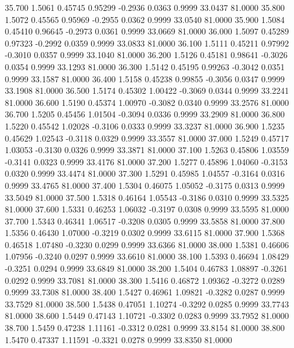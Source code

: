   35.700   1.5061   0.45745   0.95299  -0.2936   0.0363   0.9999  33.0437  81.0000
  35.800   1.5072   0.45565   0.95969  -0.2955   0.0362   0.9999  33.0540  81.0000
  35.900   1.5084   0.45410   0.96645  -0.2973   0.0361   0.9999  33.0669  81.0000
  36.000   1.5097   0.45289   0.97323  -0.2992   0.0359   0.9999  33.0833  81.0000
  36.100   1.5111   0.45211   0.97992  -0.3010   0.0357   0.9999  33.1040  81.0000
  36.200   1.5126   0.45181   0.98641  -0.3026   0.0354   0.9999  33.1293  81.0000
  36.300   1.5142   0.45195   0.99263  -0.3042   0.0351   0.9999  33.1587  81.0000
  36.400   1.5158   0.45238   0.99855  -0.3056   0.0347   0.9999  33.1908  81.0000
  36.500   1.5174   0.45302   1.00422  -0.3069   0.0344   0.9999  33.2241  81.0000
  36.600   1.5190   0.45374   1.00970  -0.3082   0.0340   0.9999  33.2576  81.0000
  36.700   1.5205   0.45456   1.01504  -0.3094   0.0336   0.9999  33.2909  81.0000
  36.800   1.5220   0.45542   1.02028  -0.3106   0.0333   0.9999  33.3237  81.0000
  36.900   1.5235   0.45629   1.02543  -0.3118   0.0329   0.9999  33.3557  81.0000
  37.000   1.5249   0.45717   1.03053  -0.3130   0.0326   0.9999  33.3871  81.0000
  37.100   1.5263   0.45806   1.03559  -0.3141   0.0323   0.9999  33.4176  81.0000
  37.200   1.5277   0.45896   1.04060  -0.3153   0.0320   0.9999  33.4474  81.0000
  37.300   1.5291   0.45985   1.04557  -0.3164   0.0316   0.9999  33.4765  81.0000
  37.400   1.5304   0.46075   1.05052  -0.3175   0.0313   0.9999  33.5049  81.0000
  37.500   1.5318   0.46164   1.05543  -0.3186   0.0310   0.9999  33.5325  81.0000
  37.600   1.5331   0.46253   1.06032  -0.3197   0.0308   0.9999  33.5595  81.0000
  37.700   1.5343   0.46341   1.06517  -0.3208   0.0305   0.9999  33.5858  81.0000
  37.800   1.5356   0.46430   1.07000  -0.3219   0.0302   0.9999  33.6115  81.0000
  37.900   1.5368   0.46518   1.07480  -0.3230   0.0299   0.9999  33.6366  81.0000
  38.000   1.5381   0.46606   1.07956  -0.3240   0.0297   0.9999  33.6610  81.0000
  38.100   1.5393   0.46694   1.08429  -0.3251   0.0294   0.9999  33.6849  81.0000
  38.200   1.5404   0.46783   1.08897  -0.3261   0.0292   0.9999  33.7081  81.0000
  38.300   1.5416   0.46872   1.09362  -0.3272   0.0289   0.9999  33.7308  81.0000
  38.400   1.5427   0.46961   1.09821  -0.3282   0.0287   0.9999  33.7529  81.0000
  38.500   1.5438   0.47051   1.10274  -0.3292   0.0285   0.9999  33.7743  81.0000
  38.600   1.5449   0.47143   1.10721  -0.3302   0.0283   0.9999  33.7952  81.0000
  38.700   1.5459   0.47238   1.11161  -0.3312   0.0281   0.9999  33.8154  81.0000
  38.800   1.5470   0.47337   1.11591  -0.3321   0.0278   0.9999  33.8350  81.0000

